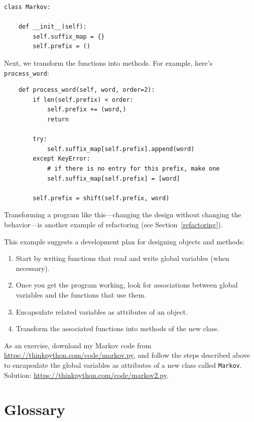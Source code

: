 \documentclass[10pt]{book}
\begin{document}
\begin{verbatim}
class Markov:

    def __init__(self):
        self.suffix_map = {}
        self.prefix = ()
\end{verbatim}

Next, we transform the functions into methods.  For example,
here's \verb"process_word":

\begin{verbatim}
    def process_word(self, word, order=2):
        if len(self.prefix) < order:
            self.prefix += (word,)
            return

        try:
            self.suffix_map[self.prefix].append(word)
        except KeyError:
            # if there is no entry for this prefix, make one
            self.suffix_map[self.prefix] = [word]

        self.prefix = shift(self.prefix, word)
\end{verbatim}

Transforming a program like this---changing the design without
changing the behavior---is another example of refactoring
(see Section~\ref{refactoring}).

This example suggests a development plan for designing objects and
methods:

\begin{enumerate}

\item Start by writing functions that read and write global
variables (when necessary).

\item Once you get the program working, look for associations
between global variables and the functions that use them.

\item Encapsulate related variables as attributes of an object.

\item Transform the associated functions into methods of the new
class.

\end{enumerate}

As an exercise, download my Markov code from
\url{https://thinkpython.com/code/markov.py}, and follow the steps
described above to encapsulate the global variables as attributes of a
new class called {\tt Markov}.  Solution:
\url{https://thinkpython.com/code/markov2.py}.


\section{Glossary}
\end{document}
